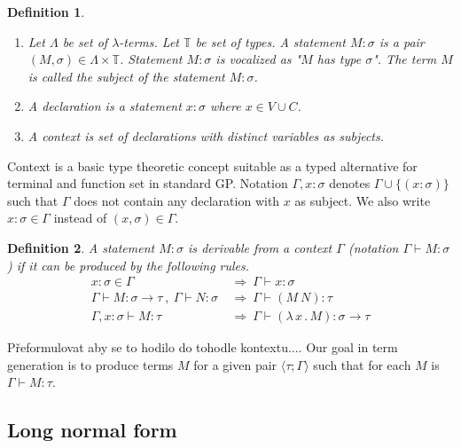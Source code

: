\documentclass{sig-alternate}
\newtheorem{definition}{Definition}
\newcommand{\lterms}{$\lambda$-terms\xspace}
\newcommand{\tur}[3]{#1\vdash{}#2 \colon #3}
\newcommand{\then}{\Rightarrow\xspace}
\newcommand{\lamb}[2]{( \lambda \, #1 \, . \, #2 )}
\newcommand{\ar}{\rightarrow\xspace}
\newcommand{\ul}[2]{\langle #1 ; #2 \rangle}
\begin{document}
\begin{definition}~

\begin{enumerate}
 \item 	Let $\Lambda$ be set of {\it \lterms}. 
	Let $\mathbb{T}$ be set of {\it types}.       
	A {\it statement} $M : \sigma$ is a pair 
	$(M,\sigma) \in \Lambda \times \mathbb{T}$.
	Statement $M : \sigma$ is vocalized as 
	{\it "$M$ has type $\sigma$"}.
	The term $M$ is called the {\it subject} of the 
	statement $M : \sigma$.
 \item A \textit{declaration} is a statement 
 $x : \sigma$ where $x \in V \cup C$.
  
 \item A \textit{context} 
 is set of declarations with distinct variables as subjects.
\end{enumerate}
\end{definition}

Context is a basic type theoretic concept suitable as a typed alternative
for terminal and function set in standard GP. 
Notation $\Gamma,x:\sigma $ denotes $ \Gamma\cup\{(x:\sigma)\}$ 
such that $\Gamma$ does not contain any declaration with $x$ as subject.
We also write $x:\sigma \in \Gamma$ instead of $(x,\sigma) \in \Gamma$.

\begin{definition}
A statement $M\colon\sigma$ is \textit{derivable from}
a context $\Gamma$ (notation 
\mbox{$\Gamma\vdash{}M\colon\sigma$}) 
if it can be produced by the following rules.
\begin{align*}
x : \sigma \in \Gamma &~\then~ \tur{\Gamma}{x}{\sigma}\\
\tur{\Gamma}{M}{\sigma \ar \tau}~,~\tur{\Gamma}{N}{\sigma} 
&~\then~ \tur{\Gamma}{(M~N)}{\tau}\\  
\tur{\Gamma,x:\sigma}{M}{\tau}
&~\then~ \tur{\Gamma}{\lamb{x}{M}}{\sigma \ar \tau} 
\end{align*}
\end{definition}

Přeformulovat aby se to hodilo do tohodle kontextu....
Our goal in term generation is to produce terms $M$
for a given pair $\ul{\tau}{\Gamma}$
such that for each $M$ is $\tur{\Gamma}{M}{\tau}$.


\subsection{Long normal form}
\label{lnf}
\end{document}
